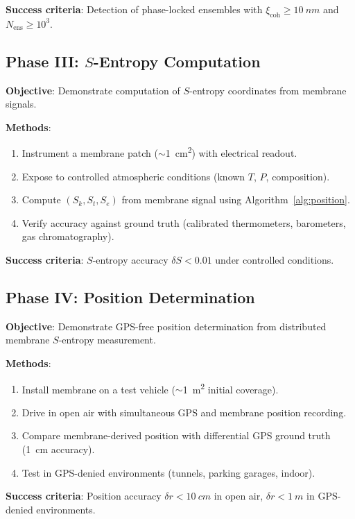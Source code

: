 \documentclass[twocolumn,10pt]{article}
\theoremstyle{definition}
\theoremstyle{remark}
\newcommand{\Sk}{S_k}
\newcommand{\St}{S_t}
\newcommand{\Se}{S_e}
\newcommand{\xicoh}{\xi_{\mathrm{coh}}}
\newcommand{\Nens}{N_{\mathrm{ens}}}
\begin{document}
\textbf{Success criteria}: Detection of phase-locked ensembles with $\xicoh \geq \SI{10}{nm}$ and $\Nens \geq 10^3$.

\subsection{Phase III: $S$-Entropy Computation}

\textbf{Objective}: Demonstrate computation of $S$-entropy coordinates from membrane signals.

\textbf{Methods}:
\begin{enumerate}[label=\arabic*.]
  \item Instrument a membrane patch ($\sim$\SI{1}{cm^2}) with electrical readout.
  \item Expose to controlled atmospheric conditions (known $T$, $P$, composition).
  \item Compute $(\Sk, \St, \Se)$ from membrane signal using Algorithm~\ref{alg:position}.
  \item Verify accuracy against ground truth (calibrated thermometers, barometers, gas chromatography).
\end{enumerate}

\textbf{Success criteria}: $S$-entropy accuracy $\delta S < 0.01$ under controlled conditions.

\subsection{Phase IV: Position Determination}

\textbf{Objective}: Demonstrate GPS-free position determination from distributed membrane $S$-entropy measurement.

\textbf{Methods}:
\begin{enumerate}[label=\arabic*.]
  \item Install membrane on a test vehicle ($\sim$\SI{1}{m^2} initial coverage).
  \item Drive in open air with simultaneous GPS and membrane position recording.
  \item Compare membrane-derived position with differential GPS ground truth (\SI{1}{cm} accuracy).
  \item Test in GPS-denied environments (tunnels, parking garages, indoor).
\end{enumerate}

\textbf{Success criteria}: Position accuracy $\delta r < \SI{10}{cm}$ in open air, $\delta r < \SI{1}{m}$ in GPS-denied environments.
\end{document}
